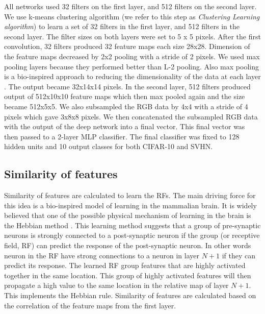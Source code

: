 \documentclass{article} %
\begin{document}
All networks used 32 filters on the first layer, and 512 filters on the second layer. We use k-means clustering algorithm (we refer to this step as \textit{Clustering Learning algorithm}) to learn a set of 32 filters in the first layer, and 512 filters in the second layer. The filter sizes on both layers were set to 5 x 5 pixels.  After the first convolution, 32 filters produced 32 feature maps each size 28x28. Dimension of the feature maps decreased by 2x2 pooling with a stride of 2 pixels. We used max pooling layers because they performed better than L-2 pooling. Also max pooling is a bio-inspired approach to reducing the dimensionality of the data at each layer \cite{lampl2004intracellular}. The output became 32x14x14 pixels. In the second layer, 512 filters produced output of 512x10x10 feature maps which then max pooled again and the size became 512x5x5. 
We also subsampled the RGB data by 4x4 with a stride of 4 pixels which gave 3x8x8 pixels.  We then concatenated the subsampled RGB data with the output of the deep network into a final vector. This final vector was then passed to a 2-layer MLP classifier. The final classifier was fixed to 128 hidden units and 10 output classes for both CIFAR-10 and SVHN.






\subsection{Similarity of features}
\label{sec-similarity}
Similarity of features are calculated to learn the RFs. The main driving force for this idea is a bio-inspired model of learning in the mammalian brain. It is widely believed that one of the possible physical mechanism of learning in the brain is the Hebbian method \cite{masquelier2007learning}. This learning method suggests that a group of pre-synaptic neurons is strongly connected to a post-synaptic neuron if the group (or receptive field, RF) can predict the response of the post-synaptic neuron. In other words neuron in the RF have strong connections to a neuron in layer $N+1$ if they can predict its response. The learned RF group features that are highly activated together in the same location. This group of highly activated features will then propagate a high value to the same location in the relative map of layer $N+1$. This implements the Hebbian rule. Similarity of features are calculated based on the correlation of the feature maps from the first layer. 
\end{document}
